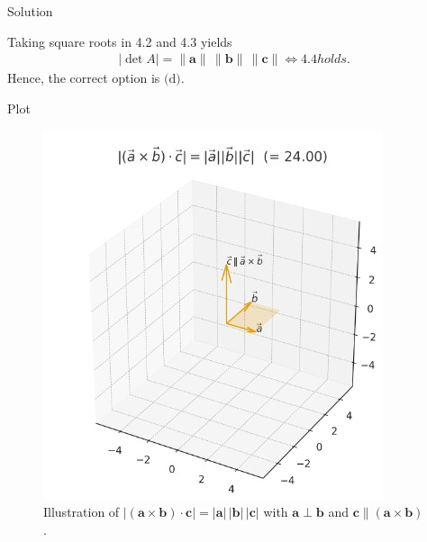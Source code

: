 \documentclass{beamer}
\theoremstyle{remark}
\providecommand{\abs}[1]{\left\vert#1\right\vert}
\let\vec\mathbf
\begin{document}
\begin{frame}{Solution}
    \begin{solution}

Taking square roots in 4.2 and 4.3 yields
\begin{align}
\abs{\det A}
= \|\vec{a}\|\,\|\vec{b}\|\,\|\vec{c}\|
\iff
4.4 holds.
\label{eq:final}
\end{align}
Hence, the correct option is \(\boxed{\text{(d)}}\).
\end{solution}
\end{frame}
\begin{frame}{Plot}
     \begin{figure}[h!]
\centering
\includegraphics[width=0.5\linewidth]{figs/2.10.28.jpeg}
\caption{Illustration of $|( \vec a\times\vec b)\cdot\vec c|=|\vec a|\,|\vec b|\,|\vec c|$ with $\vec a\perp\vec b$ and $\vec c\parallel(\vec a\times\vec b)$.}


\end{figure}
\end{frame}
\end{document}
